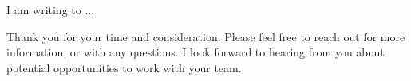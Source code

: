 \documentclass[12pt,stdletter,dateno,sigleft]{newlfm} %
\begin{document}
\begin{newlfm}


I am writing to ...

Thank you for your time and consideration.  Please feel free to reach out for more information, or with any questions.  I look forward to hearing from you about potential opportunities to work with your team.

\end{newlfm}

\end{document}
